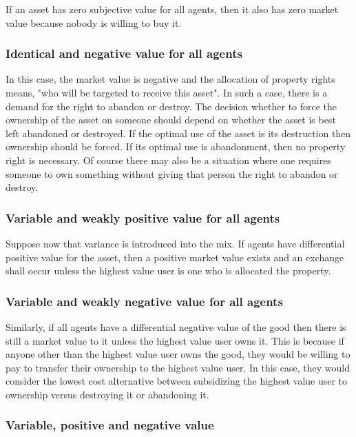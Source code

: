 If an asset has zero subjective value for all agents, then it also has zero market value because nobody is willing to buy it.

\subsubsection{Identical and negative value for all agents}

In this case, the market value is negative and the allocation of property rights means,  "who will be targeted to receive this asset". In such a case, there is a demand for the right to abandon or destroy. The decision whether to force the ownership of the asset on someone should depend on whether the asset is best left abandoned or destroyed. If the optimal use of the asset is its destruction then ownership should be forced. If its optimal use is abandonment, then no property right is necessary. Of course there may also be a situation where one requires someone to own something without giving that person the right to abandon or destroy.

\subsubsection{Variable and weakly positive value for all agents}

Suppose now that variance is introduced into the mix. If agents have differential positive value for the asset, then a positive market value exists and an exchange shall occur unless the highest value user is one who is allocated the property.

\subsubsection{Variable and weakly negative value for all agents}

Similarly, if all agents have a differential negative value of the good then there is still a market value to it unless the highest value user owns it. This is because if anyone other than the highest value user owns the good, they would be willing to pay to transfer their ownership to the highest value user. In this case, they would consider the lowest cost alternative between subsidizing the highest value user to ownership versus destroying it or abandoning it.

\subsubsection{Variable, positive and negative value}

